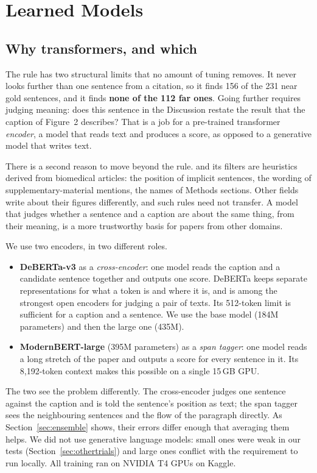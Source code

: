 \section{Learned Models}
\label{sec:models}

\subsection{Why transformers, and which}
The rule has two structural limits that no amount of tuning removes. It never looks further than one sentence
from a citation, so it finds 156 of the 231 near gold sentences, and it finds \textbf{none of the 112 far
ones}. Going further requires judging meaning: does this sentence in the Discussion restate the result that
the caption of Figure~2 describes? That is a job for a pre-trained transformer \emph{encoder}, a model that
reads text and produces a score, as opposed to a generative model that writes text.

There is a second reason to move beyond the rule. \bof{} and its filters are heuristics derived from
biomedical articles: the position of implicit sentences, the wording of supplementary-material mentions, the
names of Methods sections. Other fields write about their figures differently, and such rules need not
transfer. A model that judges whether a sentence and a caption are about the same thing, from their meaning,
is a more trustworthy basis for papers from other domains.

We use two encoders, in two different roles.
\begin{itemize}
  \item \textbf{DeBERTa-v3} \citep{he2023debertav3} as a \emph{cross-encoder}: one model reads the caption and
        a candidate sentence together and outputs one score. DeBERTa keeps separate representations for what a
        token is and where it is, and is among the strongest open encoders for judging a pair of texts. Its
        512-token limit is sufficient for a caption and a sentence. We use the base model (184M parameters)
        and then the large one (435M).
  \item \textbf{ModernBERT-large} \citep{warner2024modernbert} (395M parameters) as a \emph{span tagger}: one
        model reads a long stretch of the paper and outputs a score for every sentence in it. Its
        8{,}192-token context makes this possible on a single 15\,GB GPU.
\end{itemize}
The two see the problem differently. The cross-encoder judges one sentence against the caption and is told the
sentence's position as text; the span tagger sees the neighbouring sentences and the flow of the paragraph
directly. As Section~\ref{sec:ensemble} shows, their errors differ enough that averaging them helps. We did not
use generative language models: small ones were weak in our tests (Section~\ref{sec:othertrials}) and large
ones conflict with the requirement to run locally. All training ran on NVIDIA T4 GPUs on Kaggle.

